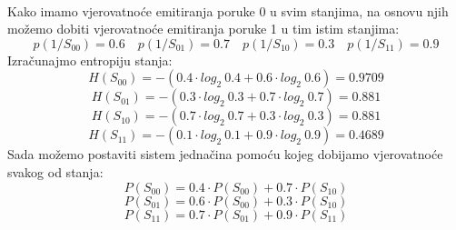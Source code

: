 \documentclass[12pt]{article}
\begin{document}
\begin{enumerate}
\\
Kako imamo vjerovatnoće emitiranja poruke 0 u svim stanjima, na osnovu
njih možemo dobiti vjerovatnoće emitiranja poruke 1 u tim istim stanjima:
\begin{equation*}
    p(1/S_{00}) = 0.6 \quad p(1/S_{01}) = 0.7 \quad p(1/S_{10}) = 0.3 \quad p(1/S_{11}) = 0.9 
\end{equation*}
Izračunajmo entropiju stanja: \\
\begin{equation*}
    H(S_{00}) = -(0.4 \cdot log_2~0.4 + 0.6 \cdot log_2~0.6) = 0.9709
\end{equation*}
\begin{equation*}
    H(S_{01}) = -(0.3 \cdot log_2~0.3 + 0.7 \cdot log_2~0.7) = 0.881
\end{equation*}
\begin{equation*}
    H(S_{10}) = -(0.7 \cdot log_2~0.7 + 0.3 \cdot log_2~0.3) = 0.881
\end{equation*}
\begin{equation*}
    H(S_{11}) = -(0.1 \cdot log_2~0.1 + 0.9 \cdot log_2~0.9) = 0.4689
\end{equation*}
Sada možemo postaviti sistem jednačina pomoću kojeg dobijamo vjerovatnoće svakog od stanja:
\begin{equation*}
    P(S_{00}) = 0.4 \cdot P(S_{00}) + 0.7 \cdot P(S_{10})
\end{equation*}
\begin{equation*}
    P(S_{01}) = 0.6 \cdot P(S_{00}) + 0.3 \cdot P(S_{10})
\end{equation*}
\begin{equation*}
    P(S_{11}) = 0.7 \cdot P(S_{01}) + 0.9 \cdot P(S_{11})
\end{equation*}

\end{enumerate}
\end{document}
